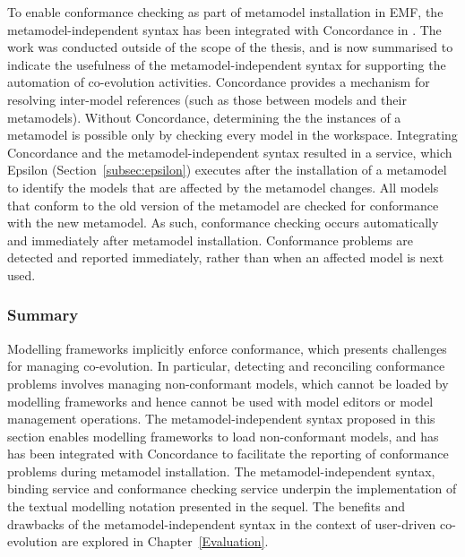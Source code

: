 To enable conformance checking as part of metamodel installation in EMF, the metamodel-independent syntax has been integrated with Concordance in \cite{rose10concordance}. The work was conducted outside of the scope of the thesis, and is now summarised to indicate the usefulness of the metamodel-independent syntax for supporting the automation of co-evolution activities. Concordance provides a mechanism for resolving inter-model references (such as those between models and their metamodels). Without Concordance, determining the the instances of a metamodel is possible only by checking every model in the workspace. Integrating Concordance and the metamodel-independent syntax resulted in a service, which Epsilon (Section~\ref{subsec:epsilon}) executes after the installation of a metamodel to identify the models that are affected by the metamodel changes. All models that conform to the old version of the metamodel are checked for conformance with the new metamodel. As such, conformance checking occurs automatically and immediately after metamodel installation. Conformance problems are detected and reported immediately, rather than when an affected model is next used.

\subsubsection{Summary}
Modelling frameworks implicitly enforce conformance, which presents challenges for managing co-evolution. In particular, detecting and reconciling conformance problems involves managing non-conformant models, which cannot be loaded by modelling frameworks and hence cannot be used with model editors or model management operations. The metamodel-independent syntax proposed in this section enables modelling frameworks to load non-conformant models, and has has been integrated with Concordance \cite{rose10concordance} to facilitate the reporting of conformance problems during metamodel installation. The metamodel-independent syntax, binding service and conformance checking service underpin the implementation of the textual modelling notation presented in the sequel. The benefits and drawbacks of the metamodel-independent syntax in the context of user-driven co-evolution are explored in Chapter~\ref{Evaluation}. 
